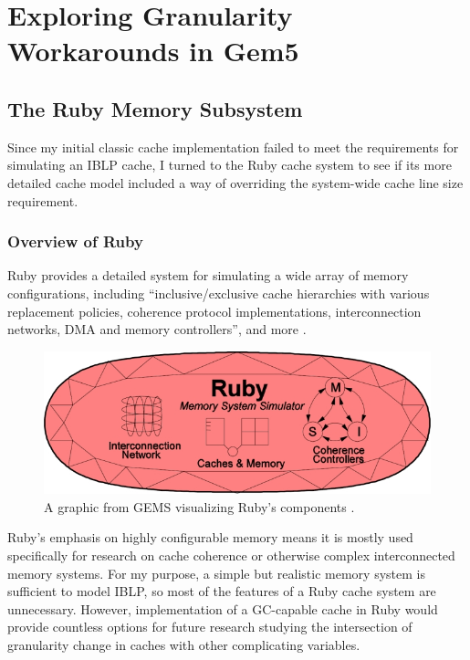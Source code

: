\documentclass[12pt,twoside]{reedthesis}
\begin{document}
\chapter{Exploring Granularity Workarounds in Gem5}

\section{The Ruby Memory Subsystem}

	Since my initial classic cache implementation failed to meet the requirements for simulating an IBLP cache, I turned to the Ruby cache system to see if its more detailed cache model included a way of overriding the system-wide cache line size requirement.

	\subsection*{Overview of Ruby}

	Ruby provides a detailed system for simulating a wide array of memory configurations, including ``inclusive/exclusive cache hierarchies with various replacement policies, coherence protocol implementations, interconnection networks, DMA and memory controllers'', and more \cite{gem5-ruby}.

	\begin{figure}[h]
		\centering
		\includegraphics[width=4.5in]{figures/ruby.jpg}
		\caption{A graphic from GEMS visualizing Ruby's components \cite{gem5-ruby}.}
	\end{figure}

	Ruby's emphasis on highly configurable memory means it is mostly used specifically for research on cache coherence or otherwise complex interconnected memory systems. For my purpose, a simple but realistic memory system is sufficient to model IBLP, so most of the features of a Ruby cache system are unnecessary. However, implementation of a GC-capable cache in Ruby would provide countless options for future research studying the intersection of granularity change in caches with other complicating variables.
\end{document}
